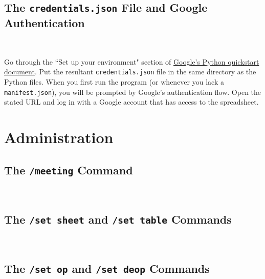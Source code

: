 \documentclass{article}
\begin{document}
\subsection{The \texttt{credentials.json} File and Google Authentication}

\

Go through the ``Set up your environment" section of \href{https://developers.google.com/sheets/api/quickstart/python#set-up-environment}{Google's Python quickstart document}. Put the resultant \texttt{credentials.json} file in the same directory as the Python files. When you first run the program (or whenever you lack a \texttt{manifest.json}), you will be prompted by Google's authentication flow. Open the stated URL and log in with a Google account that has access to the spreadsheet.

\section{Administration}

\subsection{The \texttt{/meeting} Command}

\

\subsection{The \texttt{/set sheet} and \texttt{/set table} Commands}

\

\subsection{The \texttt{/set op} and \texttt{/set deop} Commands}

\
\end{document}
